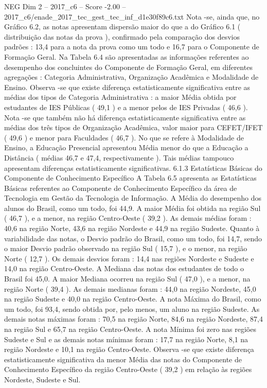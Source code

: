 \begin{textsample}{NEG Dim 2 – 2017\_c6 – Score -2.00 – 2017\_c6/enade\_2017\_tec\_gest\_tec\_inf\_d1e30f89c6.txt}
Nota -se, ainda que, no Gráfico 6.2, as notas apresentam dispersão maior do que a do Gráfico 6.1 ( distribuição das notas da prova ), confirmado pela comparação dos desvios padrões : 13,4 para a nota da prova como um todo e 16,7 para o Componente de Formação Geral.
Na Tabela 6.4 são apresentadas as informações referentes ao desempenho dos concluintes do Componente de Formação Geral, em diferentes agregações : Categoria Administrativa, Organização Acadêmica e Modalidade de Ensino.
Observa -se que existe diferença estatisticamente significativa entre as médias dos tipos de Categoria Administrativa : a maior Média obtida por estudantes de IES Públicas ( 49,1 ) e a menor pelos de IES Privadas ( 46,6 ).
Nota -se que também não há diferença estatisticamente significativa entre as médias dos três tipos de Organização Acadêmica, valor maior para CEFET/IFET ( 49,6 ) e menor para Faculdades ( 46,7 ).
No que se refere à Modalidade de Ensino, a Educação Presencial apresentou Média menor do que a Educação a Distância ( médias 46,7 e 47,4, respectivamente ).
Tais médias tampouco apresentam diferenças estatisticamente significativas. 6.1.3 Estatísticas Básicas do Componente de Conhecimento Específico A Tabela 6.5 apresenta as Estatísticas Básicas referentes ao Componente de Conhecimento Específico da área de Tecnologia em Gestão da Tecnologia de Informação.
A Média do desempenho dos alunos do Brasil, como um todo, foi 44,9.
A maior Média foi obtida na região Sul ( 46,7 ), e a menor, na região Centro-Oeste ( 39,2 ).
As demais médias foram : 40,6 na região Norte, 43,6 na região Nordeste e 44,9 na região Sudeste.
Quanto à variabilidade das notas, o Desvio padrão do Brasil, como um todo, foi 14,7, sendo o maior Desvio padrão observado na região Sul ( 15,7 ), e o menor, na região Norte ( 12,7 ).
Os demais desvios foram : 14,4 nas regiões Nordeste e Sudeste e 14,0 na região Centro-Oeste.
A Mediana das notas dos estudantes de todo o Brasil foi 45,0.
A maior Mediana ocorreu na região Sul ( 47,0 ), e a menor, na região Norte ( 39,4 ).
As demais medianas foram : 44,0 na região Nordeste, 45,0 na região Sudeste e 40,0 na região Centro-Oeste.
A nota Máxima do Brasil, como um todo, foi 93,4, sendo obtida por, pelo menos, um aluno na região Sudeste.
As demais notas máximas foram : 70,5 na região Norte, 84,6 na região Nordeste, 87,4 na região Sul e 65,7 na região Centro-Oeste.
A nota Mínima foi zero nas regiões Sudeste e Sul e as demais notas mínimas foram : 17,7 na região Norte, 8,1 na região Nordeste e 10,1 na região Centro-Oeste.
Observa -se que existe diferença estatisticamente significativa da menor Média das notas do Componente de Conhecimento Específico da região Centro-Oeste ( 39,2 ) em relação às regiões Nordeste, Sudeste e Sul.

\end{textsample}
